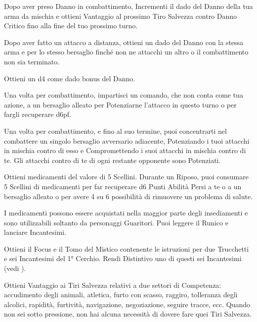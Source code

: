 \documentclass[itdr]{subfiles}
\begin{document}
\vfill
{}\feathp
Dopo aver preso Danno in combattimento, Incrementi il dado del Danno della tua arma da mischia e ottieni Vantaggio al prossimo Tiro Salvezza contro Danno Critico fino alla fine del tuo prossimo turno.

\vfill
{}
Dopo aver fatto un attacco a distanza, ottieni un dado del Danno con la stessa arma e per lo stesso bersaglio finché non ne attacchi un altro o il combattimento non sia terminato.

\vfill
{}\featmt\feathp
Ottieni un d4 come dado bonus del Danno.

\break

\vfill
{}
Una volta per combattimento, impartisci un comando, che non conta come tua azione, a un bersaglio alleato per Potenziarne l’attacco in questo turno o per fargli recuperare d6pf.

\vfill
{}\feathp
Una volta per combattimento, e fino al suo termine, puoi concentrarti nel combattere un singolo bersaglio avversario adiacente, Potenziando i tuoi attacchi in mischia contro di esso e Compromettendo i suoi attacchi in mischia contro di te. Gli attacchi contro di te di ogni restante \mbox{opponente} sono Potenziati.

\vfill
{}
Ottieni medicamenti del valore di 5 Scellini.
Durante un Riposo, puoi consumare 5 Scellini di medicamenti per far recuperare d6 Punti Abilità Persi a te o a un bersaglio alleato o per avere 4 su 6 possibilità di rimuovere un problema di salute.

I medicamenti possono essere acquistati nella maggior parte degli insediamenti e sono utilizzabili soltanto da personaggi Guaritori.
\vfill
{}
\featmt
Puoi leggere il Runico e lanciare Incantesimi.

Ottieni il Focus e il Tomo del Mistico contenente le istruzioni per due Trucchetti e sei Incantesimi del 1° Cerchio. Rendi Distintivo uno di questi sei Incantesimi (vedi \textbf{}).

\vfill
{}
\featmt
Ottieni Vantaggio ai Tiri Salvezza relativi a due settori di \mbox{Competenza}: accudimento degli animali, atletica, furto con scasso, raggiro, tolleranza degli alcolici, rapidità, furtività, navigazione, negoziazione, seguire tracce, ecc. Quando non sei sotto pressione, non hai alcuna necessità di dovere fare quei Tiri Salvezza.
\end{document}
